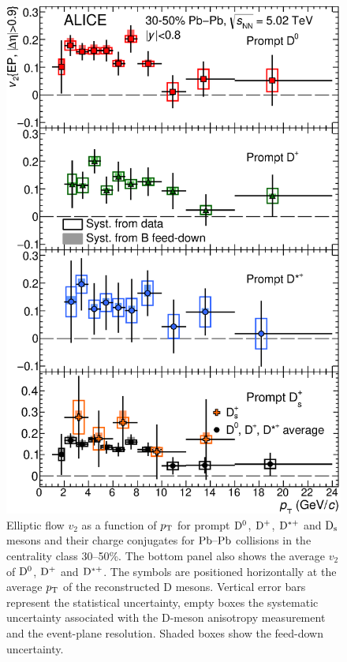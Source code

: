 \begin{figure}[!t]
\begin{center}
\includegraphics[width=.65\textwidth]{FigCap5/4mesons4pads.eps}
\caption{Elliptic flow $v_2$ as a function of $p_{\rm T}$ for prompt ${\rm D^0}$, ${\rm D^+}$, 
${\rm D^{*+}}$ and ${\rm D_s}$ mesons and their charge conjugates for 
$\mbox{Pb--Pb}$ collisions in the centrality class 30--50\%.
The bottom panel also shows the average
$v_2$ of ${\rm D^0}$, ${\rm D^+}$ and ${\rm D^{*+}}$. The symbols are positioned
horizontally at the average $p_{\rm T}$ of the reconstructed D mesons. %
Vertical error bars represent the statistical uncertainty, empty boxes the systematic 
uncertainty associated with the D-meson anisotropy measurement and the event-plane 
resolution. Shaded boxes show the feed-down uncertainty.}
\label{fig:v2_4mesons} 
\end{center}
\end{figure}

